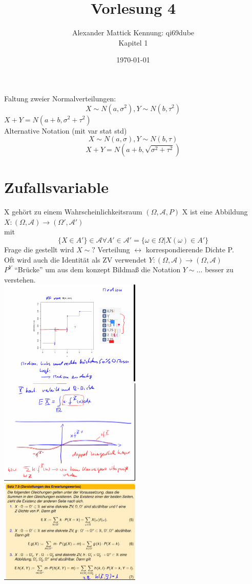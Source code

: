 \documentclass{article}
\author{
Alexander Mattick Kennung: qi69dube\\
Kapitel 1
}
\date{\today}
\title{Vorlesung 4}
\begin{document}
	\maketitle
	Faltung zweier Normalverteilungen:\\
	\[X\sim N(a,\sigma^2), Y\sim N(b,\tau^2)\]
	$X+Y = N(a+b, \sigma^2+\tau^2)$\\
	Alternative Notation (mit var stat std)
	\[X\sim N(a,\sigma), Y\sim N(b,\tau)\]
	\[X+Y = N(a+b,\sqrt{\sigma^2+\tau^2})\]
	\section{Zufallsvariable}
	X gehört zu einem Wahrscheinlichkeitsraum $(\Omega,\mathcal{A},P)$
	X ist eine Abbildung $X:(\Omega,\mathcal{A})\to (\Omega',\mathcal{A}')$\\
	mit 
	\[\{X\in A'\}\in\mathcal{A}\forall A'\in\mathcal{A}' = \{\omega\in\Omega|X(\omega)\in A'\}\]
	Frage die gestellt wird $X\sim ?$ Verteilung $\leftrightarrow$ korrespondierende Dichte P.\\
	Oft wird auch die Identität als ZV verwendet
	$Y:(\Omega, \mathcal{A})\to (\Omega,\mathcal{A})$\\
	$P^Y$ ``Brücke'' um aus dem konzept Bildmaß die Notation $Y\sim\dots$ besser zu verstehen.\\
	\includegraphics[width=256px]{median.png}
	\\
	\includegraphics[width=256px]{konvergenz.png}\\
	\includegraphics[width=256px]{DarstellungdesErwartungswertes.png}\\
\end{document}
